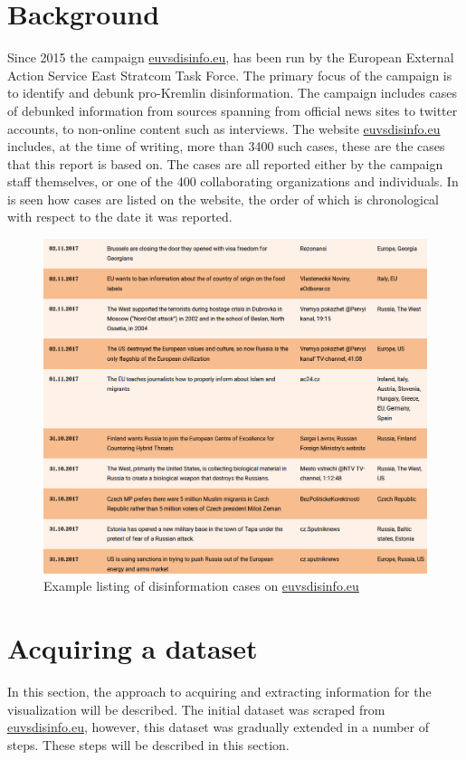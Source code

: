 \documentclass{article}
\begin{document}
\section{Background}
Since 2015 the campaign \href{https://www.euvsdisinfo.eu}{euvsdisinfo.eu}, has been run by the European External Action Service East Stratcom Task Force. The primary focus of the campaign is to identify and debunk pro-Kremlin disinformation.  %
The campaign includes cases of debunked information from sources spanning from official news sites to twitter accounts, to non-online content such as interviews. The website \href{https://www.euvsdisinfo.eu}{euvsdisinfo.eu} includes, at the time of writing, more than 3400 such cases, these are the cases that this report is based on. The cases are all reported either by the campaign staff themselves, or one of the 400 collaborating organizations and individuals.
In  is seen how cases are listed on the website, the order of which is chronological with respect to the date it was reported.

\begin{figure}[H]
    \centering
    \caption{Example listing of disinformation cases on \href{https://www.euvsdisinfo.eu}{euvsdisinfo.eu}}
    \label{fig:cases}
    \includegraphics[width=.9\textwidth]{images/example_cases.png}
\end{figure}

\section{Acquiring a dataset}
In this section, the approach to acquiring and extracting information for the visualization will be described. The initial dataset was scraped from \href{https://www.euvsdisinfo.eu}{euvsdisinfo.eu}, however, this dataset was gradually extended in a number of steps. These steps will be described in this section.
\end{document}
